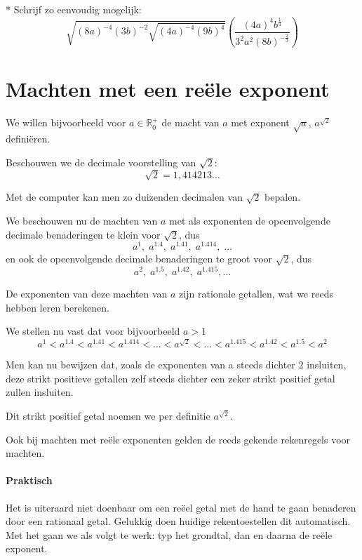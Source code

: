 \documentclass[12pt,twoside]{article}
\begin{document}
\begin{oefening}*
Schrijf zo eenvoudig mogelijk:
$$\sqrt{\left(8a\right)^{-4}\left(3b\right)^{-2}\sqrt{\left(4a\right)^{-4}\left(9b\right)^4}}\left(\dfrac{\left(4a\right)^4b^{\frac{1}{3}}}{3^2a^2\left(8b\right)^{-\frac{2}{3}}}\right)$$
\end{oefening}

\pagebreak
\section{Machten met een reële exponent}

We willen bijvoorbeeld voor $a\in\mathbb{R}_0^+$ de macht van $a$ met exponent $\sqrt{a}$, $a^{\sqrt{2}}$ definiëren.

Beschouwen we de decimale voorstelling van $\sqrt{2}$:
$$\sqrt{2} = 1,414213\ldots$$

Met de computer kan men zo duizenden decimalen van $\sqrt{2}$ bepalen.

We beschouwen nu de machten van $a$ met als exponenten de opeenvolgende
decimale benaderingen te klein voor $\sqrt{2}$, dus
$$a^1,\; a^{1.4},\; a^{1.41},\; a^{1.414},\; \ldots$$
en ook de opeenvolgende decimale benaderingen te groot voor $\sqrt{2}$, dus
$$a^2,\; a^{1.5},\; a^{1.42},\; a^{1.415}, \ldots$$

De exponenten van deze machten van $a$ zijn rationale getallen, wat we reeds hebben leren berekenen.

We stellen nu vast dat voor bijvoorbeeld $a>1$
$$a^1 < a^{1.4} < a^{1.41} < a^{1.414} < \ldots < a^{\sqrt{2}} < \ldots < a^{1.415} < a^{1.42} < a^{1.5} < a^2$$

Men kan nu bewijzen dat, zoals de exponenten van a steeds dichter 2 insluiten,
deze strikt positieve getallen zelf steeds dichter een zeker strikt positief getal zullen
insluiten.

Dit strikt positief getal noemen we per definitie $a^{\sqrt{2}}$.

Ook bij machten met reële exponenten gelden de reeds gekende rekenregels voor machten.

\paragraph*{Praktisch}

Het is uiteraard niet doenbaar om een reëel getal met de hand te gaan benaderen door een rationaal getal. Gelukkig doen huidige rekentoestellen dit automatisch. Met het  gaan we als volgt te werk: typ het grondtal, dan  en daarna de reële exponent.
\end{document}

